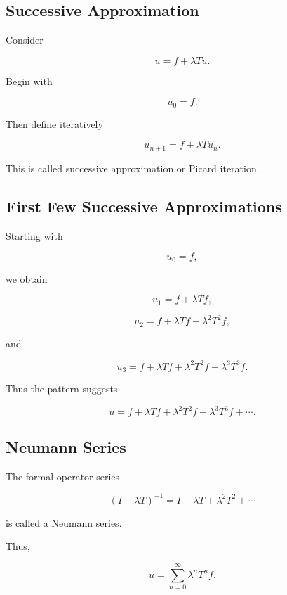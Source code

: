 \subsection{Successive Approximation}
\label{subsec:successive-approximation-integral-equations}

Consider

\[
u=f+\lambda Tu.
\]

Begin with

\[
\boxed{
u_0=f.
}
\]

Then define iteratively

\[
\boxed{
u_{n+1}
=
f+\lambda Tu_n.
}
\]

This is called successive approximation or Picard iteration.

\subsection{First Few Successive Approximations}
\label{subsec:first-successive-approximations}

Starting with

\[
u_0=f,
\]

we obtain

\[
u_1
=
f+\lambda Tf,
\]

\[
u_2
=
f+\lambda Tf+\lambda^2T^2f,
\]

and

\[
u_3
=
f+\lambda Tf+\lambda^2T^2f+\lambda^3T^3f.
\]

Thus the pattern suggests

\[
\boxed{
u
=
f
+
\lambda Tf
+
\lambda^2T^2f
+
\lambda^3T^3f
+
\cdots.
}
\]

\subsection{Neumann Series}
\label{subsec:neumann-series-integral-equations}

The formal operator series

\[
\boxed{
(I-\lambda T)^{-1}
=
I+\lambda T+\lambda^2T^2+\cdots
}
\]

is called a Neumann series.

Thus,

\[
\boxed{
u
=
\sum_{n=0}^{\infty}
\lambda^nT^nf.
}
\]

